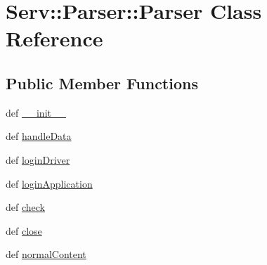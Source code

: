 \hypertarget{class_serv_1_1_parser_1_1_parser}{
\section{Serv::Parser::Parser Class Reference}
\label{class_serv_1_1_parser_1_1_parser}
}
\subsection*{Public Member Functions}
\begin{CompactItemize}
\item 
def \hyperlink{class_serv_1_1_parser_1_1_parser_8627f07c762983eff029ad167a021e38}{\_\-\_\-init\_\-\_\-}
\item 
def \hyperlink{class_serv_1_1_parser_1_1_parser_060ed5ba3cbf55b63ecc3f3aa006da04}{handleData}
\item 
def \hyperlink{class_serv_1_1_parser_1_1_parser_e092cef5abd35ec04fa61e71377e1303}{loginDriver}
\item 
def \hyperlink{class_serv_1_1_parser_1_1_parser_ec3286787a7c8642127416c77e1c2c8f}{loginApplication}
\item 
def \hyperlink{class_serv_1_1_parser_1_1_parser_93e284233267c2db61d20d9239fed4c8}{check}
\item 
def \hyperlink{class_serv_1_1_parser_1_1_parser_b6aa6195abf7a68df644640a8e4fd263}{close}
\item 
def \hyperlink{class_serv_1_1_parser_1_1_parser_dc1da4d6ff7eb9dbc114f8a426274aa0}{normalContent}
\end{CompactItemize}
